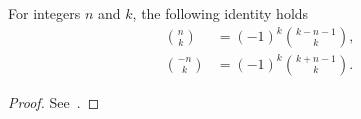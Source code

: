 \begin{lemma}
  \label{lem:upper-binomial-negation}
  For integers $n$ and $k$, the following identity holds
  \begin{align*}
    \binom{n}{k} &= (-1)^{k} \binom{k-n-1}{k}, \\
    \binom{-n}{k} &= (-1)^{k} \binom{k+n-1}{k}.
  \end{align*}
  \begin{proof}
    See~\cite[p. 164, Equation (5.14)]{graham1994concrete}.
  \end{proof}
\end{lemma}
